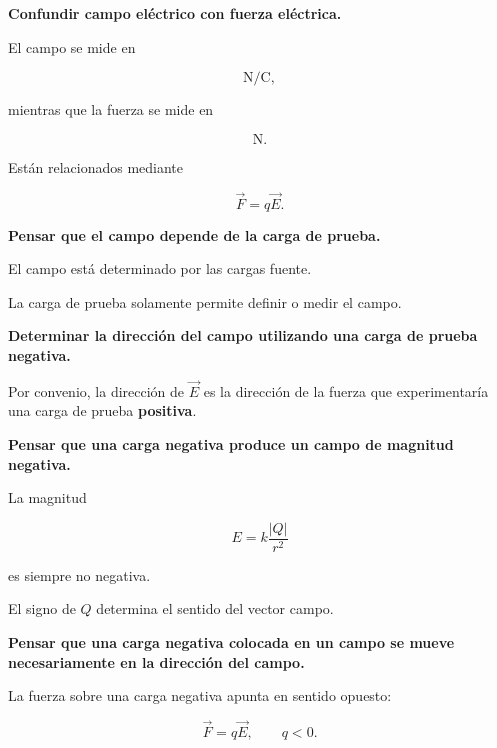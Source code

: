 \begin{errorfrecuente}

\textbf{Confundir campo eléctrico con fuerza eléctrica.}

El campo se mide en

\[
\si{\newton\per\coulomb},
\]

mientras que la fuerza se mide en

\[
\si{\newton}.
\]

Están relacionados mediante

\[
\vec F=q\vec E.
\]

\end{errorfrecuente}

\begin{errorfrecuente}

\textbf{Pensar que el campo depende de la carga de prueba.}

El campo está determinado por las cargas fuente.

La carga de prueba solamente permite definir o medir el campo.

\end{errorfrecuente}

\begin{errorfrecuente}

\textbf{Determinar la dirección del campo utilizando una carga de prueba negativa.}

Por convenio, la dirección de \(\vec E\) es la dirección de la fuerza que
experimentaría una carga de prueba \textbf{positiva}.

\end{errorfrecuente}

\begin{errorfrecuente}

\textbf{Pensar que una carga negativa produce un campo de magnitud negativa.}

La magnitud

\[
E=k\frac{|Q|}{r^2}
\]

es siempre no negativa.

El signo de \(Q\) determina el sentido del vector campo.

\end{errorfrecuente}

\begin{errorfrecuente}

\textbf{Pensar que una carga negativa colocada en un campo se mueve necesariamente
en la dirección del campo.}

La fuerza sobre una carga negativa apunta en sentido opuesto:

\[
\vec F=q\vec E,
\qquad q<0.
\]

\end{errorfrecuente}

